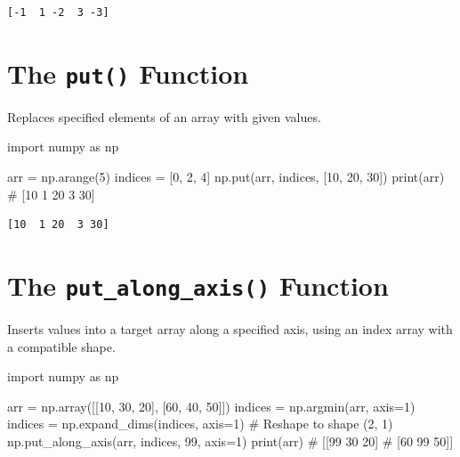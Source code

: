 \documentclass[
  english,
  letterpaper,
  DIV=11,
  numbers=noendperiod]{scrreprt}
\newenvironment{Shaded}{\begin{snugshade}}{\end{snugshade}}
\newcommand{\BuiltInTok}[1]{\textcolor[rgb]{0.00,0.23,0.31}{#1}}
\newcommand{\CommentTok}[1]{\textcolor[rgb]{0.37,0.37,0.37}{#1}}
\newcommand{\DecValTok}[1]{\textcolor[rgb]{0.68,0.00,0.00}{#1}}
\newcommand{\ImportTok}[1]{\textcolor[rgb]{0.00,0.46,0.62}{#1}}
\newcommand{\NormalTok}[1]{\textcolor[rgb]{0.00,0.23,0.31}{#1}}
\newcommand{\OperatorTok}[1]{\textcolor[rgb]{0.37,0.37,0.37}{#1}}
\begin{document}
\begin{verbatim}
[-1  1 -2  3 -3]
\end{verbatim}

\section{\texorpdfstring{The \texttt{put()}
Function}{The put() Function}}\label{the-put-function}

Replaces specified elements of an array with given values.

\begin{Shaded}
\begin{Highlighting}[]
\ImportTok{import}\NormalTok{ numpy }\ImportTok{as}\NormalTok{ np}

\NormalTok{arr }\OperatorTok{=}\NormalTok{ np.arange(}\DecValTok{5}\NormalTok{)}
\NormalTok{indices }\OperatorTok{=}\NormalTok{ [}\DecValTok{0}\NormalTok{, }\DecValTok{2}\NormalTok{, }\DecValTok{4}\NormalTok{]}
\NormalTok{np.put(arr, indices, [}\DecValTok{10}\NormalTok{, }\DecValTok{20}\NormalTok{, }\DecValTok{30}\NormalTok{])}
\BuiltInTok{print}\NormalTok{(arr)  }\CommentTok{\# [10  1 20  3 30]}
\end{Highlighting}
\end{Shaded}

\begin{verbatim}
[10  1 20  3 30]
\end{verbatim}

\section{\texorpdfstring{The \texttt{put\_along\_axis()}
Function}{The put\_along\_axis() Function}}\label{the-put_along_axis-function}

Inserts values into a target array along a specified axis, using an
index array with a compatible shape.

\begin{Shaded}
\begin{Highlighting}[]
\ImportTok{import}\NormalTok{ numpy }\ImportTok{as}\NormalTok{ np}

\NormalTok{arr }\OperatorTok{=}\NormalTok{ np.array([[}\DecValTok{10}\NormalTok{, }\DecValTok{30}\NormalTok{, }\DecValTok{20}\NormalTok{], [}\DecValTok{60}\NormalTok{, }\DecValTok{40}\NormalTok{, }\DecValTok{50}\NormalTok{]])}
\NormalTok{indices }\OperatorTok{=}\NormalTok{ np.argmin(arr, axis}\OperatorTok{=}\DecValTok{1}\NormalTok{)}
\NormalTok{indices }\OperatorTok{=}\NormalTok{ np.expand\_dims(indices, axis}\OperatorTok{=}\DecValTok{1}\NormalTok{)  }\CommentTok{\# Reshape to shape (2, 1)}
\NormalTok{np.put\_along\_axis(arr, indices, }\DecValTok{99}\NormalTok{, axis}\OperatorTok{=}\DecValTok{1}\NormalTok{)}
\BuiltInTok{print}\NormalTok{(arr)}
\CommentTok{\# [[99 30 20]}
\CommentTok{\#  [60 99 50]]}
\end{Highlighting}
\end{Shaded}
\end{document}
